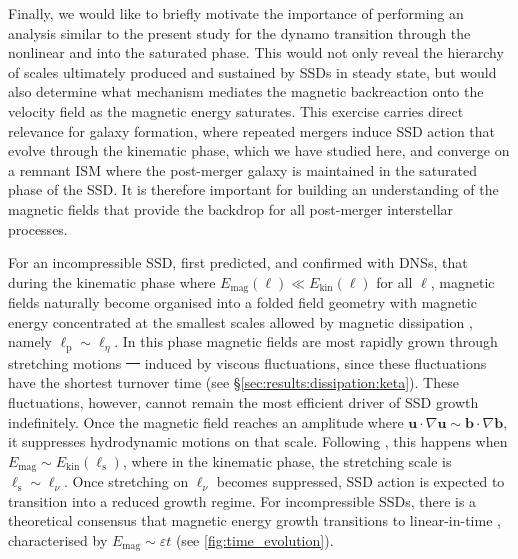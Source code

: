 \documentclass[12pt,twoside]{extreport}
\makeatletter
\newcommand{\mVector}[1]{\bm{#1}} %
\newcommand{\eg}{e.g.,\xspace} %
\providecommand{\DIFaddtex}[1]{{\protect\color{DIFgreen}\uwave{#1}}} %
\providecommand{\DIFdeltex}[1]{{\protect\color{DIFpurple}\sout{#1}}} %
\providecommand{\DIFaddbegin}{} %
\providecommand{\DIFaddend}{} %
\providecommand{\DIFdelbegin}{} %
\providecommand{\DIFdelend}{} %
\providecommand{\DIFadd}[1]{\texorpdfstring{\DIFaddtex{#1}}{#1}} %
\providecommand{\DIFdel}[1]{\texorpdfstring{\DIFdeltex{#1}}{}} %
\providecommand{\DIFscaledelfig}{0.5}
\newlength{\DIFdelgraphicswidth} %
\newlength{\DIFdelgraphicsheight} %
\providecommand{\DIFaddincludegraphics}[2][]{{\color{DIFgreen}\fbox{\DIFOincludegraphics[#1]{#2}}}} %
\providecommand{\DIFdelincludegraphics}[2][]{%
\sbox{\DIFdelgraphicsbox}{\DIFOincludegraphics[#1]{#2}}%
\settoboxwidth{\DIFdelgraphicswidth}{\DIFdelgraphicsbox} %
\settoboxtotalheight{\DIFdelgraphicsheight}{\DIFdelgraphicsbox} %
\scalebox{\DIFscaledelfig}{%
\parbox[b]{\DIFdelgraphicswidth}{\usebox{\DIFdelgraphicsbox}\\[-\baselineskip] \rule{\DIFdelgraphicswidth}{0em}}\llap{\resizebox{\DIFdelgraphicswidth}{\DIFdelgraphicsheight}{%
\setlength{\unitlength}{\DIFdelgraphicswidth}%
\begin{picture}(1,1)%
\thicklines\linethickness{2pt} %
{\color{DIFpurple}\put(0,0){\framebox(1,1){}}}%
{\color{DIFpurple}\put(0,0){\line( 1,1){1}}}%
{\color{DIFpurple}\put(0,1){\line(1,-1){1}}}%
\end{picture}%
}\hspace*{3pt}}} %
} %
\DeclareRobustCommand{\DIFaddbegin}{\DIFOaddbegin \let\includegraphics\DIFaddincludegraphics} %
\DeclareRobustCommand{\DIFaddend}{\DIFOaddend \let\includegraphics\DIFOincludegraphics} %
\DeclareRobustCommand{\DIFdelbegin}{\DIFOdelbegin \let\includegraphics\DIFdelincludegraphics} %
\DeclareRobustCommand{\DIFdelend}{\DIFOaddend \let\includegraphics\DIFOincludegraphics} %
\let\sout@orig\sout %
\renewcommand{\sout}[1]{\ifmmode\text{\sout@orig{\ensuremath{#1}}}\else\sout@orig{#1}\fi} %
\makeatother
\begin{document}
Finally, we would like to briefly motivate the importance of performing an analysis similar to the present study for the dynamo transition through the nonlinear and into the saturated phase. This would not only reveal the hierarchy of scales ultimately produced and sustained by SSDs in steady state, but would also determine what mechanism mediates the magnetic backreaction onto the velocity field as the magnetic energy saturates. This exercise carries direct relevance for galaxy formation, where repeated mergers induce SSD action that evolve through the kinematic phase, which we have studied here, and converge on a remnant ISM where the post-merger galaxy is maintained in the saturated phase of the SSD. It is therefore important for building an understanding of the magnetic fields that provide the backdrop for all post-merger interstellar processes.

For an incompressible SSD, \citet{schekochihin2001structure, schekochihin2002small, schekochihin2004simulations} first predicted, and  confirmed with DNSs, that during the kinematic phase where $E_\mathrm{mag}(\ell) \ll E_\mathrm{kin}(\ell)$ for all $\ell$, magnetic fields naturally become organised into a folded field geometry with magnetic energy concentrated at the smallest scales allowed by magnetic dissipation \citep[see also \eg][]{brandenburg2023dissipative}, namely $\ell_\mathrm{p} \sim \ell_\eta$. In this phase magnetic fields are most rapidly grown through stretching motions \DIFdelbegin \DIFdel{\mbox{%
\citep{beattie2023bulk} }\hskip0pt%
}\DIFdelend \DIFaddbegin \DIFadd{\mbox{%
\citep{cho2009growth, beattie2023bulk} }\hskip0pt%
}\DIFaddend induced by viscous fluctuations, since these fluctuations have the shortest turnover time (see \S\ref{sec:results:dissipation:keta}). These fluctuations, however, cannot remain the most efficient driver of SSD growth indefinitely. Once the magnetic field reaches an amplitude where $\mVector{u}\cdot\nabla\mVector{u} \sim \mVector{b}\cdot\nabla\mVector{b}$, it suppresses hydrodynamic motions on that scale. Following \citet{schekochihin2002model}, this happens when $E_\mathrm{mag} \sim E_\mathrm{kin}(\ell_\mathrm{s})$, where in the kinematic phase, the stretching scale is $\ell_\mathrm{s} \sim \ell_\nu$. Once stretching on $\ell_\nu$ becomes suppressed, SSD action is expected to transition into a reduced growth regime. For incompressible SSDs, there is a theoretical consensus that magnetic energy growth transitions to linear-in-time \citep{cho2009growth, beresnyak2012universal, Xu2016_dynamo, seta2020saturation}, characterised by $E_\mathrm{mag} \sim \varepsilon t$ (see \autoref{fig:time_evolution}).
\end{document}
